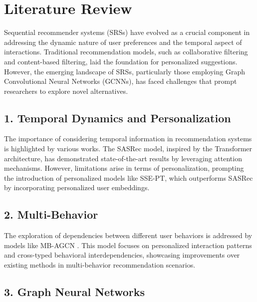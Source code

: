 \documentclass[journal]{IEEEtran}
\begin{document}
\section{Literature Review}
Sequential recommender systems (SRSs) have evolved as a crucial component in addressing the dynamic nature \cite{10.1145/3383313.3412258} of user 
preferences and the temporal aspect of interactions. Traditional recommendation models, such as collaborative filtering 
and content-based filtering, laid the foundation for personalized suggestions. However, the emerging landscape of SRSs, 
particularly those employing Graph Convolutional Neural Networks (GCNNs), has faced challenges that prompt researchers 
to explore novel alternatives.

\subsection*{1. Temporal Dynamics and Personalization}
The importance of considering temporal information in recommendation systems is highlighted by various works. The SASRec model, 
inspired by the Transformer architecture, has demonstrated state-of-the-art results by leveraging attention mechanisms. 
However, limitations arise in terms of personalization, prompting the introduction of personalized models like SSE-PT, 
which outperforms SASRec by incorporating personalized user embeddings.



\subsection*{2. Multi-Behavior}

The exploration of dependencies between different user behaviors is addressed by models like MB-AGCN \cite{PENG2023111040}. This model focuses on 
personalized interaction patterns and cross-typed behavioral interdependencies, showcasing improvements over existing methods 
in multi-behavior recommendation scenarios.

\subsection*{3. Graph Neural Networks}
\end{document}
